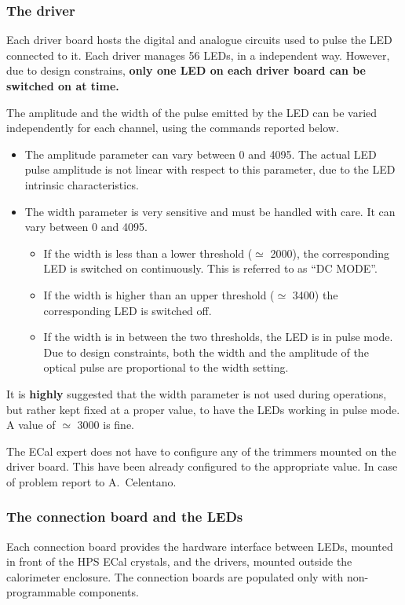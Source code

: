\documentclass[12pt]{article}
\begin{document}
\subsubsection{The driver}

Each driver board hosts the digital and analogue circuits used to pulse the LED connected to it. Each driver manages 56 LEDs, in a independent way. However, due to design constrains, \textbf{only one LED on each driver board can be switched on at time.}

The amplitude and the width of the pulse emitted by the LED can be varied independently for each channel, using the commands reported below.
\begin{itemize}
\item{The amplitude parameter can vary between 0 and 4095. The actual LED pulse amplitude is not linear with respect to this parameter, due to the LED intrinsic characteristics.}
\item{The width parameter is very sensitive and must be handled with care. It can vary between 0 and 4095.
\begin{itemize}
\item{If the width is less than a lower threshold ($\simeq$ 2000), the corresponding LED is switched on continuously. This is referred to as ``DC MODE''.}
\item{If the width is higher than an upper threshold ($\simeq$ 3400) the corresponding LED is switched off.}
\item{If the width is in between the two thresholds, the LED is in pulse mode. Due to design constraints, both the width and the amplitude of the optical pulse are proportional to the width setting.}
\end{itemize}
}
\end{itemize}
It is \textbf{highly} suggested that the width parameter is not used during operations, but rather kept fixed at a proper value, to have the LEDs working in pulse mode. A value of $\simeq$ 3000 is fine. 

The ECal expert does not have to configure any of the trimmers mounted on the driver board. This have been already configured to the appropriate value. In case of problem report to A.~Celentano. 

\subsubsection{The connection board and the LEDs}

Each connection board provides the hardware interface between LEDs, mounted in front of the HPS ECal crystals, and the drivers, mounted outside the calorimeter enclosure. The connection boards are populated only with non-programmable components. 
\end{document}
